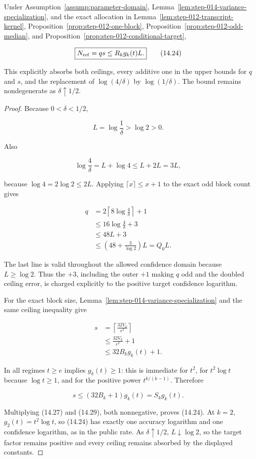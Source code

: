 \begin{lemma}\label{lem:step-014-refinement-count}
Under Assumption~\ref{assump:parameter-domain},
Lemma~\ref{lem:step-014-variance-specialization}, and the exact
allocation in Lemma~\ref{lem:step-012-transcript-kernel}, Proposition~\ref{prop:step-012-one-block}, Proposition~\ref{prop:step-012-odd-median}, and Proposition~\ref{prop:step-012-conditional-target},

\[
\boxed{N_{\rm ref}=qs\leq R_kg_k(t)L.}
\tag{14.24}
\]

This explicitly absorbs both ceilings, every additive one in the upper
bounds for \(q\) and \(s\), and the replacement of
\(\log(4/\delta)\) by \(\log(1/\delta)\). The bound remains nondegenerate
as \(\delta\uparrow1/2\).
\end{lemma}

\begin{proof}
Because \(0<\delta<1/2\),

\[
L=\log\frac1\delta>\log2>0.
\tag{14.25}
\]

Also

\[
\log\frac4\delta
=L+\log4
\leq L+2L
=3L,
\tag{14.26}
\]

because \(\log4=2\log2\leq2L\). Applying
\(\lceil x\rceil\leq x+1\) to the exact odd block count gives

\[
\begin{aligned}
q
&=2\left\lceil8\log\frac4\delta\right\rceil+1\\
&\leq16\log\frac4\delta+3\\
&\leq48L+3\\
&\leq\left(48+\frac3{\log2}\right)L
=Q_0L.
\end{aligned}
\tag{14.27}
\]

The last line is valid throughout the allowed confidence domain because
\(L\geq\log2\). Thus the \(+3\), including the outer \(+1\) making \(q\)
odd and the doubled ceiling error, is charged explicitly to the positive
target confidence logarithm.

For the exact block size, Lemma~\ref{lem:step-014-variance-specialization}
and the same ceiling inequality give

\[
\begin{aligned}
s
&=\left\lceil\frac{32V_k}{\epsilon^2}\right\rceil\\
&\leq\frac{32V_k}{\epsilon^2}+1\\
&\leq32B_kg_k(t)+1.
\end{aligned}
\tag{14.28}
\]

In all regimes \(t\geq e\) implies \(g_k(t)\geq1\): this is immediate for
\(t^2\), for \(t^2\log t\) because \(\log t\geq1\), and for the positive
power \(t^{k/(k-1)}\). Therefore

\[
s\leq(32B_k+1)g_k(t)=S_kg_k(t).
\tag{14.29}
\]

Multiplying (14.27) and (14.29), both nonnegative, proves (14.24).
At \(k=2\), \(g_2(t)=t^2\log t\), so (14.24) has exactly one accuracy
logarithm and one confidence logarithm, as in the public rate. As
\(\delta\uparrow1/2\), \(L\downarrow\log2\), so the target factor remains
positive and every ceiling remains absorbed by the displayed constants.
\end{proof}

